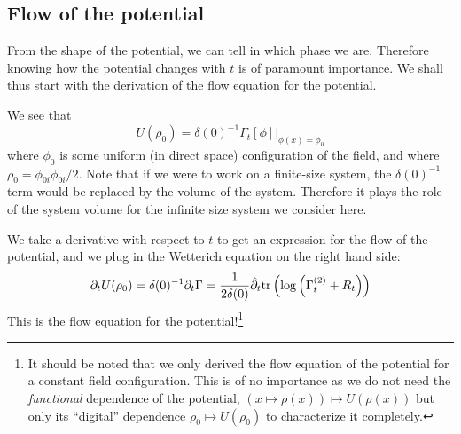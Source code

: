 \subsection{Flow of the potential}
From the shape of the potential, we can tell in which phase we are. Therefore knowing how the potential changes with $t$ is of paramount importance. We shall thus start with the derivation of the flow equation for the potential.

We see that 
\begin{equation}
U(\rho_0) = \delta(0)^{-1} \Gamma_t[ \phi] |_{\phi(x) = \phi_0}
\end{equation}
where $\phi_0$ is some uniform (in direct space) configuration of the field, and where $\rho_0 = \phi_{0i} \phi_{0i}/2$. Note that if we were to work on a finite-size system, the $\delta(0)^{-1}$ term would be replaced by the volume of the system. Therefore it plays the role of the system volume for the infinite size system we consider here.

We take a derivative with respect to $t$ to get an expression for the flow of the potential, and we plug in the Wetterich equation on the right hand side:
\begin{equation}
 \partial_t U(\rho_0) = \delta(0)^{-1} \partial_t \Gamma = \frac{1}{2 \delta(0)} \hat \partial_t  \text{tr}\left(\log\left( \Gamma_t^{(2)} + R_t  \right)\right) 
\end{equation}
This is the flow equation for the potential!\footnote{It should be noted that we only derived the flow equation of the potential for a constant field configuration. This is of no importance as we do not need the \textit{functional} dependence of the potential, $(x \mapsto \rho(x)) \mapsto U(\rho(x))$ but only its ``digital'' dependence $\rho_0 \mapsto U(\rho_0)$ to characterize it completely.}

